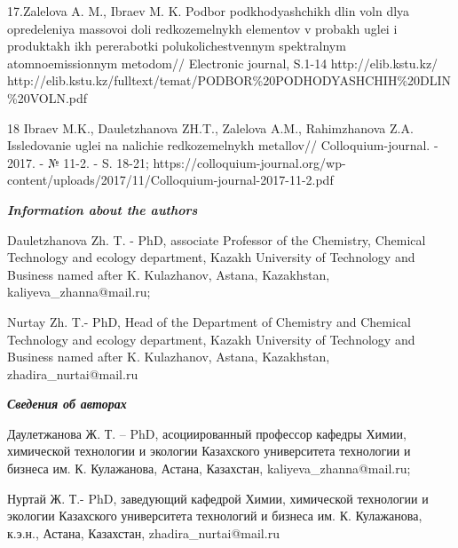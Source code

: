 17.Zalelova A. M., Ibraev M. K. Podbor podkhodyashchikh dlin voln dlya
opredeleniya massovoi doli redkozemel\textquotesingle nykh elementov v
probakh uglei i produktakh ikh pererabotki polukolichestvennym
spektral\textquotesingle nym atomnoemissionnym metodom// Electronic
journal, S.1-14 http://elib.kstu.kz/
http://elib.kstu.kz/fulltext/temat/PODBOR\%20PODHODYASHCHIH\%20DLIN\%20VOLN.pdf

18 Ibraev M.K., Dauletzhanova ZH.T., Zalelova A.M., Rahimzhanova Z.A.
Issledovanie uglei na nalichie redkozemel\textquotesingle nykh
metallov// Colloquium-journal. - 2017. - № 11-2. - S. 18-21;
https://colloquium-journal.org/wp-content/uploads/2017/11/Colloquium-journal-2017-11-2.pdf

\emph{{\bfseries Information about the authors}}

Dauletzhanova Zh. T. - PhD, associate Professor of the Chemistry,
Chemical Technology and ecology department, Kazakh University of
Technology and Business named after K. Kulazhanov, Astana, Kazakhstan,
kaliyeva\_zhanna@mail.ru;

Nurtay Zh. T.- PhD, Head of the Department of Chemistry and Chemical
Technology and ecology department, Kazakh University of Technology and
Business named after K. Kulazhanov, Astana, Kazakhstan,
zhadira\_nurtai@mail.ru

\emph{{\bfseries Сведения об авторах}}

Даулетжанова Ж. Т. -- PhD, асоциированный профессор кафедры Химии,
химической технологии и экологии Казахского университета технологии и
бизнеса им. К. Кулажанова, Астана, Казахстан, kaliyeva\_zhanna@mail.ru;

Нуртай Ж. Т.- PhD, заведующий кафедрой Химии, химической технологии и
экологии Казахского университета технологий и бизнеса им. К. Кулажанова,
к.э.н., Астана, Казахстан, zhadira\_nurtai@mail.ru
